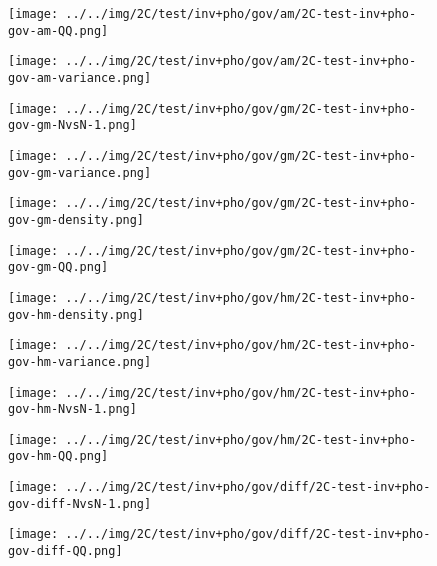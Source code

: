 \begin{figure}[H]
\centering	\texttt{[image: ../../img/2C/test/inv+pho/gov/am/2C-test-inv+pho-gov-am-QQ.png]}
\end{figure}
\begin{figure}[H]
\centering	\texttt{[image: ../../img/2C/test/inv+pho/gov/am/2C-test-inv+pho-gov-am-variance.png]}
\end{figure}
\begin{figure}[H]
\centering	\texttt{[image: ../../img/2C/test/inv+pho/gov/gm/2C-test-inv+pho-gov-gm-NvsN-1.png]}
\end{figure}
\begin{figure}[H]
\centering	\texttt{[image: ../../img/2C/test/inv+pho/gov/gm/2C-test-inv+pho-gov-gm-variance.png]}
\end{figure}
\begin{figure}[H]
\centering	\texttt{[image: ../../img/2C/test/inv+pho/gov/gm/2C-test-inv+pho-gov-gm-density.png]}
\end{figure}
\begin{figure}[H]
\centering	\texttt{[image: ../../img/2C/test/inv+pho/gov/gm/2C-test-inv+pho-gov-gm-QQ.png]}
\end{figure}
\begin{figure}[H]
\centering	\texttt{[image: ../../img/2C/test/inv+pho/gov/hm/2C-test-inv+pho-gov-hm-density.png]}
\end{figure}
\begin{figure}[H]
\centering	\texttt{[image: ../../img/2C/test/inv+pho/gov/hm/2C-test-inv+pho-gov-hm-variance.png]}
\end{figure}
\begin{figure}[H]
\centering	\texttt{[image: ../../img/2C/test/inv+pho/gov/hm/2C-test-inv+pho-gov-hm-NvsN-1.png]}
\end{figure}
\begin{figure}[H]
\centering	\texttt{[image: ../../img/2C/test/inv+pho/gov/hm/2C-test-inv+pho-gov-hm-QQ.png]}
\end{figure}
\begin{figure}[H]
\centering	\texttt{[image: ../../img/2C/test/inv+pho/gov/diff/2C-test-inv+pho-gov-diff-NvsN-1.png]}
\end{figure}
\begin{figure}[H]
\centering	\texttt{[image: ../../img/2C/test/inv+pho/gov/diff/2C-test-inv+pho-gov-diff-QQ.png]}
\end{figure}
